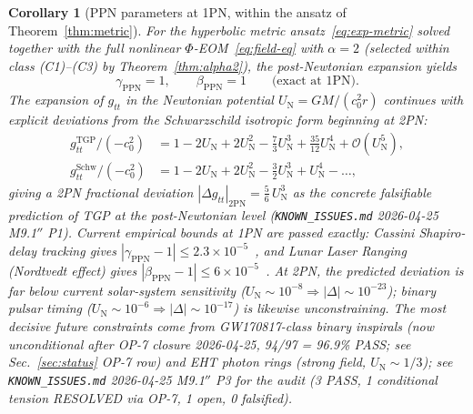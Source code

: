 \documentclass[11pt,a4paper]{article}
\renewcommand{\Phi}{\varPhi}
\newtheorem{corollary}[axiom]{Corollary}
\begin{document}
\begin{corollary}[PPN parameters at 1PN, within the ansatz of
Theorem~\ref{thm:metric}]\label{cor:ppn}
For the hyperbolic metric ansatz~\eqref{eq:exp-metric} solved together
with the full nonlinear $\Phi$-EOM~\eqref{eq:field-eq} with $\alpha=2$
(selected within class (C1)--(C3) by Theorem~\ref{thm:alpha2}),
the post-Newtonian expansion yields
\begin{equation}\label{eq:ppn}
  \gamma_{\mathrm{PPN}}=1,\qquad \beta_{\mathrm{PPN}}=1
  \qquad\text{(exact at 1PN)}.
\end{equation}
The expansion of $g_{tt}$ in the Newtonian potential
$U_{\mathrm{N}}=GM/(c_{0}^{2}r)$ continues with explicit deviations
from the Schwarzschild isotropic form beginning at 2PN:
\begin{align}\label{eq:gtt-expansion}
  g_{tt}^{\mathrm{TGP}}/(-c_{0}^{2})
  &=1-2U_{\mathrm{N}}+2U_{\mathrm{N}}^{2}-\tfrac{7}{3}U_{\mathrm{N}}^{3}
   +\tfrac{35}{12}U_{\mathrm{N}}^{4}+\mathcal{O}(U_{\mathrm{N}}^{5}),
   \nonumber\\
  g_{tt}^{\mathrm{Schw}}/(-c_{0}^{2})
  &=1-2U_{\mathrm{N}}+2U_{\mathrm{N}}^{2}-\tfrac{3}{2}U_{\mathrm{N}}^{3}
   +U_{\mathrm{N}}^{4}-\ldots,
\end{align}
giving a 2PN fractional deviation
$|\Delta g_{tt}|_{2\mathrm{PN}}=\tfrac{5}{6}\,U_{\mathrm{N}}^{3}$ as
\emph{the} concrete falsifiable prediction of TGP at the post-Newtonian
level (\texttt{KNOWN\_ISSUES.md} 2026-04-25 M9.1$''$ P1).
Current empirical bounds at 1PN are passed exactly:
Cassini Shapiro-delay tracking gives
$|\gamma_{\mathrm{PPN}}-1|\leq 2.3\times 10^{-5}$~\cite{BertottiCassini},
and Lunar Laser Ranging (Nordtvedt effect) gives
$|\beta_{\mathrm{PPN}}-1|\leq 6\times 10^{-5}$~\cite{WilliamsLLR}.
At 2PN, the predicted deviation is far below current solar-system
sensitivity ($U_{\mathrm{N}}\sim 10^{-8}\Rightarrow|\Delta|\sim 10^{-23}$);
binary pulsar timing
($U_{\mathrm{N}}\sim 10^{-6}\Rightarrow|\Delta|\sim 10^{-17}$) is
likewise unconstraining. The most decisive future constraints come
from GW170817-class binary inspirals (now \emph{unconditional} after
OP-7 closure 2026-04-25, 94/97 = 96.9\% PASS; see Sec.~\ref{sec:status}
OP-7 row) and EHT photon rings (strong field,
$U_{\mathrm{N}}\sim 1/3$); see \texttt{KNOWN\_ISSUES.md} 2026-04-25
M9.1$''$ P3 for the audit (3 PASS, 1 conditional tension RESOLVED via
OP-7, 1 open, 0 falsified).
\end{corollary}
\end{document}

